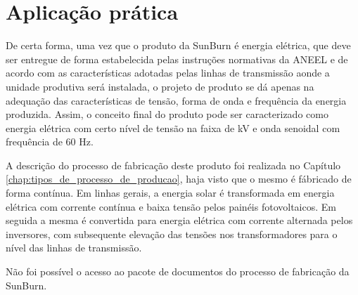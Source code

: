 \section{Aplicação prática}
\label{sec:projeto_do_produto_aplicacao}

De certa forma, uma vez que o produto da SunBurn é energia elétrica, que deve ser entregue de forma estabelecida pelas instruções normativas da \ac{ANEEL} e de acordo com as características adotadas pelas linhas de transmissão aonde a unidade produtiva será instalada, o projeto de produto se dá apenas na adequação das características de tensão, forma de onda e frequência da energia produzida. Assim, o conceito final do produto pode ser caracterizado como energia elétrica com certo nível de tensão na faixa de kV e onda senoidal com frequência de 60 Hz.

A descrição do processo de fabricação deste produto foi realizada no Capítulo \ref{chap:tipos_de_processo_de_producao}, haja visto que o mesmo é fábricado de forma contínua. Em linhas gerais, a energia solar é transformada em energia elétrica com corrente contínua e baixa tensão pelos painéis fotovoltaicos. Em seguida a mesma é convertida para energia elétrica com corrente alternada pelos inversores, com subsequente elevação das tensões nos transformadores para o nível das linhas de transmissão.

Não foi possível o acesso ao pacote de documentos do processo de fabricação da SunBurn.